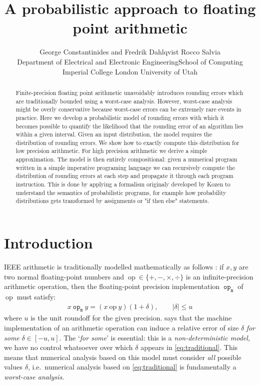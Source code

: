 \documentclass[10pt,conference]{IEEEtran}
\title{A probabilistic approach to floating point arithmetic}
\author{George Constantinides and Fredrik Dahlqvist \hspace{10em}Rocco Salvia \\ Department of Electrical and Electronic Engineering\hspace{7em}School of Computing \\ \hspace{5em}Imperial College London \hspace{12.5em} University of Utah}
\newcommand{\ie}{i.e.\ }
\newcommand{\mop}{~\mathtt{op_m}~}
\newcommand{\iop}{~\mathrm{op}~}
\newcommand{\absv}[1]{\vert #1\vert}
\begin{document}
\maketitle

\begin{abstract}
Finite-precision floating point arithmetic unavoidably introduces rounding errors which are traditionally bounded using a worst-case analysis. However, worst-case analysis might be overly conservative because worst-case errors can be extremely rare events in practice. Here we develop a probabilistic model of rounding errors with which it becomes possible to quantify the likelihood that the rounding error of an algorithm lies within a given interval. 
Given an input distribution, the model requires the distribution of rounding errors. We show how to exactly compute this distribution for low precision arithmetic. For high precision arithmetic we derive a simple approximation. The model is then entirely compositional: given a numerical program written in a simple imperative programing language we can recursively compute the distribution of rounding errors at each step and propagate it through each program instruction. This is done by applying a formalism originaly developed by Kozen to understand the semantics of probabilistic programs, for example how probability distributions gets transformed by assignments or "if then else" statements.
\end{abstract}

\section{Introduction}

IEEE arithmetic \cite{ieee754} is traditionally modelled mathematically as follows \cite{higham2002accuracy}: if $x,y$ are two normal floating-point numbers and $\iop\in\{+,-,\times,\div\}$ is an infinite-precision arithmetic operation, then the floating-point precision implementation $\mop$ of $\iop$ must satisfy:
\begin{align}
x\mop y=(x\iop y)(1+\delta), \qquad\absv{\delta}\leq u\label{eq:traditional}
\end{align}
where $u$ is the unit roundoff for the given precision.  says that the machine implementation of an arithmetic operation can induce a relative error of size $\delta$ \emph{for some} $\delta\in\left[-u,u\right]$. The `\emph{for some}' is essential: this is a \emph{non-deterministic model}, we have no control whatsoever over which $\delta$ appears in \cref{eq:traditional}. This means that numerical analysis based on this model must consider \emph{all} possible values $\delta$, \ie numerical analysis based on \cref{eq:traditional} is fundamentally a \emph{worst-case analysis}. 
\end{document}

